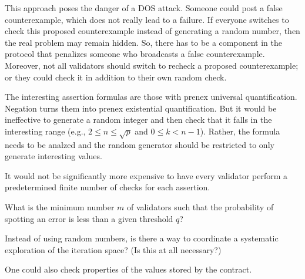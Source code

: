 \documentclass{article}
\begin{document}
This approach poses the danger of a DOS attack. Someone could post a false
counterexample, which does not really lead to a failure. If everyone switches to check
this proposed counterexample instead of generating a random number, then the real
problem may remain hidden. So, there has to be a component in the protocol that
penalizes someone who broadcasts a false counterexample. Moreover, not all validators
should switch to recheck a proposed counterexample; or they could check it in addition
to their own random check.

The interesting assertion formulas are those with prenex universal
quantification. Negation turns them into prenex existential quantification. But it
would be ineffective to generate a random integer and then check that it falls in the
interesting range (e.g., $2\le n \le \sqrt p$ and $0\le k< n-1$). Rather, the formula
needs to be analzed and the random generator should be restricted to only generate
interesting values. 

It would not be significantly more expensive to have every validator perform a
predetermined finite number of checks for each assertion.

What is the minimum number $m$ of validators such that the probability of spotting an
error is less than a given threshold $q$?

Instead of using random numbers, is there a way to coordinate a systematic exploration
of the iteration space? (Is this at all necessary?)

One could also check properties of the values stored by the contract.
\end{document}
